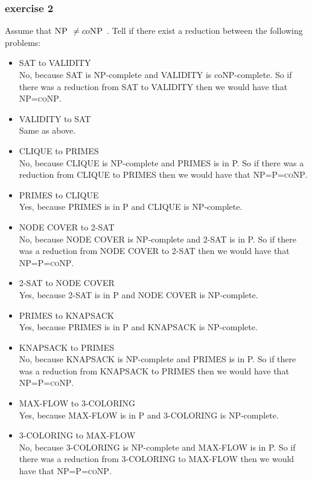 \documentclass[12pt]{article}
\newcommand{\NP}{\textsc{NP }}
\newcommand{\coNP}{co\textsc{NP }}
\begin{document}
\subsubsection{exercise 2}
Assume that $\NP\not=\coNP$. Tell if there exist a reduction between the following problems:
\begin{itemize}
  \item \textsc{SAT} to \textsc{VALIDITY}\\
  No, because \textsc{SAT} is NP-complete and \textsc{VALIDITY} is co\textsc{NP}-complete. So if there was a reduction from \textsc{SAT} to \textsc{VALIDITY} then we would have that \textsc{NP}=\textsc{coNP}.
  \item \textsc{VALIDITY} to \textsc{SAT}\\
  Same as above.
  \item \textsc{CLIQUE} to \textsc{PRIMES}\\
  No, because \textsc{CLIQUE} is NP-complete and \textsc{PRIMES} is in P. So if there was a reduction from \textsc{CLIQUE} to \textsc{PRIMES} then we would have that \textsc{NP}=\textsc{P}=\textsc{coNP}.
  \item \textsc{PRIMES} to \textsc{CLIQUE}\\
  Yes, because \textsc{PRIMES} is in P and \textsc{CLIQUE} is NP-complete.
  \item \textsc{NODE COVER} to \textsc{2-SAT}\\
  No, because \textsc{NODE COVER} is NP-complete and \textsc{2-SAT} is in P. So if there was a reduction from \textsc{NODE COVER} to \textsc{2-SAT} then we would have that \textsc{NP}=\textsc{P}=\textsc{coNP}.
  \item \textsc{2-SAT} to \textsc{NODE COVER}\\
  Yes, because \textsc{2-SAT} is in P and \textsc{NODE COVER} is NP-complete.
  \item \textsc{PRIMES} to \textsc{KNAPSACK}\\
  Yes, because \textsc{PRIMES} is in P and \textsc{KNAPSACK} is NP-complete.
  \item \textsc{KNAPSACK} to \textsc{PRIMES}\\
  No, because \textsc{KNAPSACK} is NP-complete and \textsc{PRIMES} is in P. So if there was a reduction from \textsc{KNAPSACK} to \textsc{PRIMES} then we would have that \textsc{NP}=\textsc{P}=\textsc{coNP}.
  \item \textsc{MAX-FLOW} to \textsc{3-COLORING}\\
  Yes, because \textsc{MAX-FLOW} is in P and \textsc{3-COLORING} is NP-complete.
  \item \textsc{3-COLORING} to \textsc{MAX-FLOW}\\
  No, because \textsc{3-COLORING} is NP-complete and \textsc{MAX-FLOW} is in P. So if there was a reduction from \textsc{3-COLORING} to \textsc{MAX-FLOW} then we would have that \textsc{NP}=\textsc{P}=\textsc{coNP}.
\end{itemize}
\end{document}
